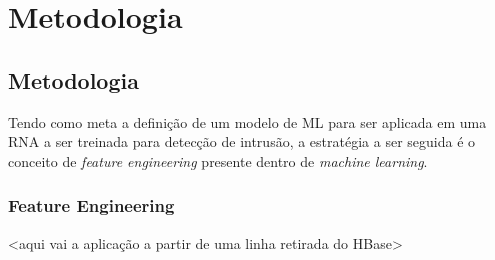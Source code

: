 \part{Metodologia}
\chapter[Metodologia]{Metodologia}

Tendo como meta a definição de um modelo de ML para ser aplicada em uma RNA a ser treinada para detecção de intrusão, a estratégia a ser seguida é o conceito de \textit{feature engineering} presente dentro de \textit{machine learning}.

\section{Feature Engineering}
    <aqui vai a aplicação a partir de uma linha retirada do HBase>